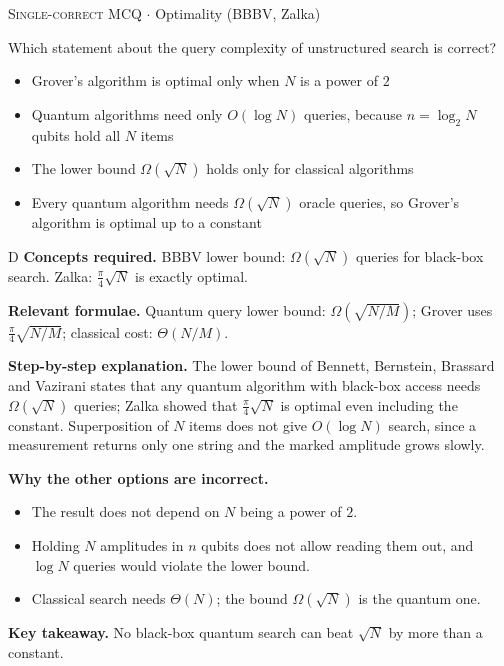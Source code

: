 \documentclass[11pt,a4paper]{article}
\newcommand{\optlabel}[1]{\textbf{(#1)}}
\newcommand{\correctlabel}[1]{\textcolor{okgreen}{\textbf{(#1)}\,\ding{51}}}
\newenvironment{qitem}[1]{\begin{list}{}{\setlength{\leftmargin}{3.3em}\setlength{\labelwidth}{3.1em}%
  \setlength{\labelsep}{0.2em}\setlength{\topsep}{3pt}\setlength{\parsep}{3pt}}\item[\textbf{Q.#1}\hfill]}{\end{list}}
\newcommand{\qsep}{\par\vspace{2pt}{\color{black!15}\hrule}\vspace{4pt}}
\newcommand{\qmeta}[2]{{\footnotesize\color{black!60}\textsc{#1} \;$\cdot$\; #2}\par}
\begin{document}
\begin{qitem}{64}
\qmeta{Single-correct MCQ}{Optimality (BBBV, Zalka)}
Which statement about the query complexity of unstructured search is correct?
\begin{itemize}[leftmargin=2.6em, labelsep=0.4em, itemsep=2pt, topsep=3pt]
\item[\optlabel{A}] Grover's algorithm is optimal only when $N$ is a power of $2$
\item[\optlabel{B}] Quantum algorithms need only $O(\log N)$ queries, because $n = \log_2 N$ qubits hold all $N$ items
\item[\optlabel{C}] The lower bound $\Omega(\sqrt N)$ holds only for classical algorithms
\item[\correctlabel{D}] Every quantum algorithm needs $\Omega(\sqrt N)$ oracle queries, so Grover's algorithm is optimal up to a constant
\end{itemize}
\end{qitem}
\begin{solbox}{D}
\textbf{\color{brand}Concepts required.} BBBV lower bound: $\Omega(\sqrt N)$ queries for black-box search. Zalka: $\frac\pi4\sqrt N$ is exactly optimal.

\textbf{\color{brand}Relevant formulae.} Quantum query lower bound: $\Omega(\sqrt{N/M})$; Grover uses $\frac\pi4\sqrt{N/M}$; classical cost: $\Theta(N/M)$.

\textbf{\color{brand}Step-by-step explanation.} The lower bound of Bennett, Bernstein, Brassard and Vazirani states that any quantum algorithm with black-box access needs $\Omega(\sqrt N)$ queries; Zalka showed that $\frac\pi4\sqrt N$ is optimal even including the constant.
Superposition of $N$ items does not give $O(\log N)$ search, since a measurement returns only one string and the marked amplitude grows slowly.

\textbf{\color{brand}Why the other options are incorrect.}
\begin{itemize}[leftmargin=2.4em, itemsep=1pt, topsep=2pt]
\item[\textbf{(A)}] The result does not depend on $N$ being a power of $2$.
\item[\textbf{(B)}] Holding $N$ amplitudes in $n$ qubits does not allow reading them out, and $\log N$ queries would violate the lower bound.
\item[\textbf{(C)}] Classical search needs $\Theta(N)$; the bound $\Omega(\sqrt N)$ is the quantum one.
\end{itemize}
\textbf{\color{brand}Key takeaway.} No black-box quantum search can beat $\sqrt N$ by more than a constant.
\end{solbox}
\qsep
\end{document}
